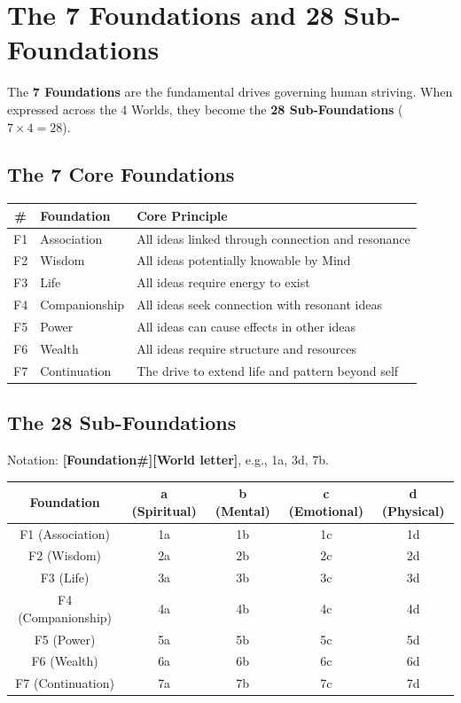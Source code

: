 \documentclass[11pt,twoside,openright]{book}
\theoremstyle{definition}
\theoremstyle{plain}
\theoremstyle{remark}
\begin{document}
\section{The 7 Foundations and 28 Sub-Foundations}
\label{sec:foundations}

The \textbf{7 Foundations} are the fundamental drives governing human striving. When expressed across the 4 Worlds, they become the \textbf{28 Sub-Foundations} ($7 \times 4 = 28$).

\subsection{The 7 Core Foundations}

\begin{center}
\begin{tabular}{cll}
\toprule
\textbf{\#} & \textbf{Foundation} & \textbf{Core Principle} \\
\midrule
F1 & Association & All ideas linked through connection and resonance \\
F2 & Wisdom & All ideas potentially knowable by Mind \\
F3 & Life & All ideas require energy to exist \\
F4 & Companionship & All ideas seek connection with resonant ideas \\
F5 & Power & All ideas can cause effects in other ideas \\
F6 & Wealth & All ideas require structure and resources \\
F7 & Continuation & The drive to extend life and pattern beyond self \\
\bottomrule
\end{tabular}
\end{center}

\subsection{The 28 Sub-Foundations}

Notation: \textbf{[Foundation\#][World letter]}, e.g., 1a, 3d, 7b.

\begin{center}
\begin{tabular}{c|cccc}
\toprule
\textbf{Foundation} & \textbf{a (Spiritual)} & \textbf{b (Mental)} & \textbf{c (Emotional)} & \textbf{d (Physical)} \\
\midrule
F1 (Association) & 1a & 1b & 1c & 1d \\
F2 (Wisdom) & 2a & 2b & 2c & 2d \\
F3 (Life) & 3a & 3b & 3c & 3d \\
F4 (Companionship) & 4a & 4b & 4c & 4d \\
F5 (Power) & 5a & 5b & 5c & 5d \\
F6 (Wealth) & 6a & 6b & 6c & 6d \\
F7 (Continuation) & 7a & 7b & 7c & 7d \\
\bottomrule
\end{tabular}
\end{center}
\end{document}
